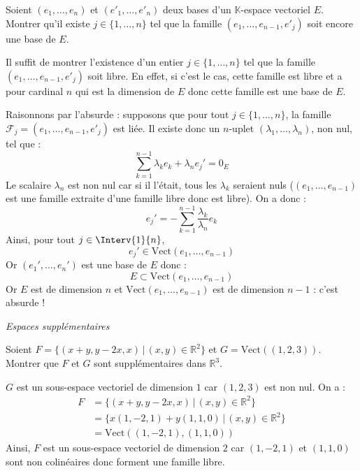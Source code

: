 \documentclass[a4paper,10pt]{report}
\begin{document}
\medskip

\begin{Exa} Soient $(e_1 , \ldots ,e_n)$ et $(e'_1 , \ldots ,e'_n)$ deux bases d'un $\mathbb{K}$-espace vectoriel $E$. Montrer qu'il existe $j \in \lbrace 1, \ldots ,n \rbrace$ tel que la famille $(e_1 , \ldots ,e_{n - 1} ,e'_j)$ soit encore une base de $E$.
\end{Exa}

\corr Il suffit de montrer l'existence d'un entier $j \in \lbrace 1, \ldots ,n \rbrace$ tel que la famille $(e_1 , \ldots ,e_{n - 1} ,e'_j)$ soit libre. En effet, si c'est le cas, cette famille est libre et a pour cardinal $n$ qui est la dimension de $E$ donc cette famille est une base de $E$.

\medskip

\noindent Raisonnons par l'absurde : supposons que pour tout $j \in \lbrace 1, \ldots ,n \rbrace$, la famille $\mathcal{F}_j=(e_1 , \ldots ,e_{n - 1} ,e'_j)$ est liée. Il existe donc un $n$-uplet $(\lambda_1, \ldots, \lambda_n)$, non nul, tel que :
$$ \sum_{k=1}^{n-1} \lambda_k e_k + \lambda_n e_j' = 0_E$$
Le scalaire $\lambda_n$ est non nul car si il l'était, tous les $\lambda_k$ seraient nuls ($(e_1, \ldots, e_{n-1})$ est une famille extraite d'une famille libre donc est libre). On a donc :
$$ e_j' = - \sum_{k=1}^{n-1} \dfrac{\lambda_k}{\lambda_n} e_k$$
Ainsi, pour tout $j \in \Interv{1}{n}$,
$$ e_j' \in \textrm{Vect}(e_1, \ldots, e_{n-1})$$
Or $(e_1', \ldots, e_n')$ est une base de $E$ donc :
$$ E \subset \textrm{Vect}(e_1, \ldots, e_{n-1})$$
Or $E$ est de dimension $n$ et $\textrm{Vect}(e_1, \ldots, e_{n-1})$ est de dimension $n-1$ : c'est absurde !

\medskip



\begin{center}
\textit{{ {\large Espaces supplémentaires}}}
\end{center}

\medskip

\begin{Exa} Soient $F= \lbrace (x+y,y-2x, x) \, \vert \,  (x,y) \in \mathbb{R}^2 \rbrace$ et $G = \textrm{Vect}((1,2,3))$. Montrer que $F$ et $G$ sont supplémentaires dans $\mathbb{R}^3$.
\end{Exa} 

\corr $G$ est un sous-espace vectoriel de dimension $1$ car $(1,2,3)$ est non nul. On a :
\begin{align*}
F & = \lbrace (x+y,y-2x, x) \, \vert \,  (x,y) \in \mathbb{R}^2 \rbrace \\
& = \lbrace x (1,-2,1) + y (1,1,0) \, \vert \, (x,y) \in \mathbb{R}^2 \rbrace \\
& = \textrm{Vect}((1,-2,1),(1,1,0)) 
\end{align*}
Ainsi, $F$ est un sous-espace vectoriel de dimension $2$ car $(1,-2,1)$ et $(1,1,0)$ sont non colinéaires donc forment une famille libre.
\end{document}
